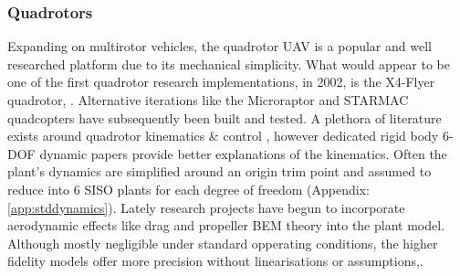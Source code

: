 \subsubsection*{Quadrotors}
Expanding on multirotor vehicles, the quadrotor UAV is a popular and well researched platform due to its mechanical simplicity. What would appear to be one of the first quadrotor research implementations, in 2002, is the X4-Flyer quadrotor, \cite{x4flyer,x4flyercontrol}. Alternative iterations like the Microraptor\cite{microraptor} and STARMAC\cite{starmac} quadcopters have subsequently been built and tested. A plethora of literature exists around quadrotor kinematics \& control \cite{dynamicmodelling2013, dynamicmodelling2009, modelingquadcopter, quaddynamics, fullquadcoptercontrol}, however dedicated rigid body 6-DOF dynamic papers \cite{rigidbodylecture,eulerrigidbody} provide better explanations of the kinematics. Often the plant's dynamics are simplified around an origin trim point and assumed to reduce into 6 SISO plants for each degree of freedom (Appendix:\ref{app:stddynamics}). Lately research projects have begun to incorporate aerodynamic effects like drag and propeller BEM theory into the plant model\cite{lowreynolds,bem,starmac}. Although mostly negligible under standard opperating conditions, the higher fidelity models offer more precision without linearisations or assumptions,\cite{nonlineardynamics,starmac}.
\par
